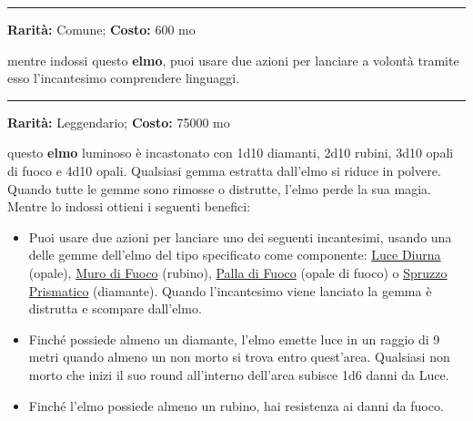 \begin{multicols}{2}
\smallskip\noindent\rule{\linewidth}{2pt}  \hypertarget{ElmodellaComprensionedeiLinguaggi}{}\smallskip{}\noindent\label{ElmodellaComprensionedeiLinguaggi}

\textbf{Rarità:} Comune; \textbf{Costo:} 600 mo

mentre indossi questo \textbf{elmo}, puoi usare due azioni per lanciare a volontà tramite esso l'incantesimo comprendere linguaggi.

\smallskip\noindent\rule{\linewidth}{2pt}  \hypertarget{ElmodellaLucentezza}{}\smallskip{}\noindent\label{ElmodellaLucentezza}

\textbf{Rarità:} Leggendario; \textbf{Costo:} 75000 mo

questo \textbf{elmo} luminoso è incastonato con 1d10 diamanti, 2d10 rubini, 3d10 opali di fuoco e 4d10 opali. Qualsiasi gemma estratta dall'elmo si riduce in polvere. Quando tutte le gemme sono rimosse o distrutte, l'elmo perde la sua magia. Mentre lo indossi ottieni i seguenti benefici:

\smallskip

\begin{itemize}[leftmargin=*] \setlength{\itemsep}{0pt}
\item
Puoi usare due azioni per lanciare uno dei seguenti incantesimi, usando una delle gemme dell'elmo del tipo specificato come componente: \hyperlink{Luce Diurna}{Luce Diurna} (opale), \hyperlink{Muro di Fuoco}{Muro di Fuoco} (rubino), \hyperlink{Palla di Fuoco}{Palla di Fuoco} (opale di fuoco) o \hyperlink{Spruzzo Prismatico}{Spruzzo Prismatico} (diamante). Quando l'incantesimo viene lanciato la gemma è distrutta e scompare dall'elmo.

\item
Finché possiede almeno un diamante, l'elmo emette luce in un raggio di 9 metri quando almeno un non morto si trova entro quest'area. Qualsiasi non morto che inizi il suo round all'interno dell'area subisce 1d6 danni da Luce.

\item
Finché l'elmo possiede almeno un rubino, hai resistenza ai danni da fuoco.
\end{itemize}

\smallskip


\end{multicols}
